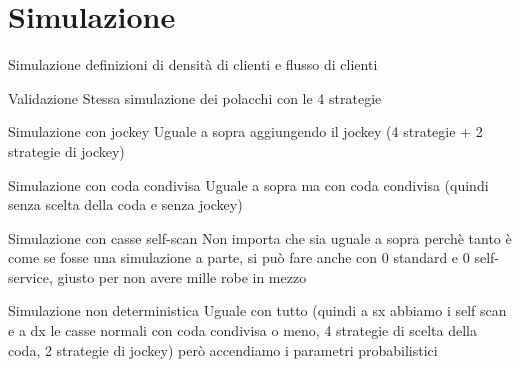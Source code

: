 \section{Simulazione}
\begin{frame}{Simulazione}
	\centering
	definizioni di densità di clienti e flusso di clienti
\end{frame}

\begin{frame}{Validazione}
	\centering
	Stessa simulazione dei polacchi con le 4 strategie
\end{frame}

\begin{frame}{Simulazione con jockey}
	\centering
	Uguale a sopra aggiungendo il jockey (4 strategie + 2 strategie di jockey)
\end{frame}

\begin{frame}{Simulazione con coda condivisa}
	\centering
	Uguale a sopra ma con coda condivisa (quindi senza scelta della coda e senza jockey)
\end{frame}

\begin{frame}{Simulazione con casse self-scan}
	\centering
	Non importa che sia uguale a sopra perchè tanto è come se fosse una simulazione a parte, si può fare anche con 0 standard e 0 self-service, giusto per non avere mille robe in mezzo
\end{frame}

\begin{frame}{Simulazione non deterministica}
	\centering
	Uguale con tutto (quindi a sx abbiamo i self scan e a dx le casse normali con coda condivisa o meno, 4 strategie di scelta della coda, 2 strategie di jockey) però accendiamo i parametri probabilistici 
\end{frame}